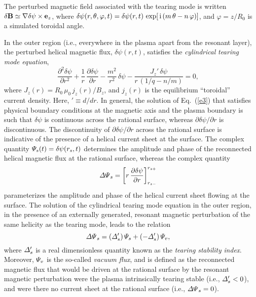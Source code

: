 \documentclass[12pt,prb,aps]{revtex4-1}
\begin{document}
The perturbed magnetic field associated with the tearing mode is written $\delta{\bf B} \simeq \nabla\delta\psi\times{\bf e}_z$,  
where
$\delta\psi(r,\theta,\varphi,t)= \delta\psi(r,t)\,\exp[\,{\rm i}\,(m\,\theta-n\,\varphi)]$, 
and $\varphi=z/R_0$ is a simulated toroidal angle. 

In the outer region  (i.e., everywhere in the plasma
apart from the resonant layer), the perturbed helical magnetic flux, $\delta\psi(r,t)$, satisfies the
{\em cylindrical tearing mode equation},\,\cite{wes}
\begin{equation}\label{e3}
\frac{\partial^2\delta\psi}{\partial r^2} + \frac{1}{r}\,\frac{\partial\delta\psi}{\partial r}-\frac{m^2}{r^2}\,\delta\psi - \frac{J_z'\,\delta\psi}{r\,(1/q-n/m)}=  0,
\end{equation}
where 
$J_z(r)= R_0\,\mu_0\,j_z(r)/B_z$,
and $j_z(r)$ is the equilibrium ``toroidal'' current density. Here, $'\equiv d/dr$. In general, the solution of Eq.~(\ref{e3}) that satisfies physical
boundary conditions at the magnetic axis and the plasma boundary is such that $\delta\psi$ is continuous
across the rational surface, whereas $\partial\delta\psi/\partial r$ is discontinuous. The discontinuity of
 $\partial\delta\psi/\partial r$ across the rational surface is indicative of the presence of a helical current
 sheet at the surface.  The complex quantity ${\mit\Psi}_s(t)= \delta\psi(r_s,t)$ determines the amplitude
 and phase of the reconnected helical magnetic flux at the rational surface, whereas the complex quantity\,\cite{rf1993}
 \begin{equation}
{\mit\Delta\Psi}_s = \left[r\,\frac{\partial \delta\psi}{\partial r}\right]_{r_{s-}}^{r_{s+}}
\end{equation}
parameterizes the amplitude and phase of the helical current sheet flowing at the surface. The solution of
the cylindrical tearing mode equation in the outer region, in the presence of an externally generated, resonant magnetic perturbation 
of the same helicity as the tearing mode, leads to the relation\,\cite{rf1993,fkr}
\begin{equation}\label{e110}
{\mit\Delta\Psi}_s= ({\mit\Delta}_s')\,{\mit\Psi}_s + (-{\mit\Delta}_s')\,{\mit\Psi}_v,
\end{equation}
where ${\mit\Delta}_s'$ is a real dimensionless quantity known as the {\em tearing stability index}. Moreover,
${\mit\Psi}_v$ is the so-called {\em vacuum flux}, and is defined as the reconnected magnetic flux
that would be driven at the rational surface by the resonant magnetic perturbation were the
plasma intrinsically tearing stable (i.e., ${\mit\Delta}_s' <0$), and were there no current sheet at the rational surface
(i.e., ${\mit\Delta\Psi}_s=0$).
\end{document}
